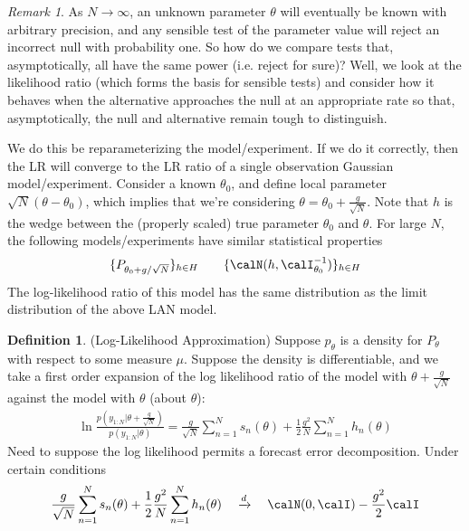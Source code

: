 \documentclass[12pt]{article}
\theoremstyle{plain}
\theoremstyle{definition}
\newtheorem{defn}[thm]{Definition}
\theoremstyle{remark}
\newtheorem*{rmk}{Remark}
\newcommand{\ra}{\rightarrow}
\newcommand{\dto}{\xrightarrow{d}}
\newcommand{\sumnN}{\sum^N_{n=1}}
\begin{document}
\begin{rmk}
As $N\ra\infty$, an unknown parameter $\theta$ will eventually be known
with arbitrary precision, and any sensible test of the parameter value
will reject an incorrect null with probability one.
So how do we compare tests that, asymptotically, all have the same power
(i.e. reject for sure)?
Well, we look at the likelihood ratio (which forms the basis for
sensible tests) and consider how it behaves when the alternative
approaches the null at an appropriate rate so that, asymptotically, the
null and alternative remain tough to distinguish.

We do this be reparameterizing the model/experiment.
If we do it correctly, then the LR will converge to the LR ratio of a
single observation Gaussian model/experiment.
Consider a known $\theta_0$, and define local parameter
$\sqrt{N}(\theta-\theta_0)$, which implies that we're considering
$\theta=\theta_0+\frac{g}{\sqrt{N}}$.
Note that $h$ is the wedge between the (properly scaled) true parameter
$\theta_0$ and $\theta$.
For large $N$, the following models/experiments have similar statistical
properties
\begin{align*}
  \{P_{\theta_0+g/\sqrt{N}}\}_{h\in H}
  \qquad
  \{\calN(h,\calI_{\theta_0}^{-1})\}_{h\in H}
\end{align*}
The log-likelihood ratio of this model has the same distribution as the
limit distribution of the above LAN model.
\end{rmk}


\begin{defn}(Log-Likelihood Approximation)
Suppose $p_\theta$ is a density for $P_\theta$ with respect to some
measure $\mu$. Suppose the density is differentiable,
and we take a first order expansion of the log likelihood ratio of the
model with $\theta+\frac{g}{\sqrt{N}}$ against the model with $\theta$
(about $\theta$):
\begin{align*}
  \ln\frac{p(y_{1:N}|\theta+\frac{g}{\sqrt{N}})}{p(y_{1:N}|\theta)}
  =
  \frac{g}{\sqrt{N}}
  \sumnN s_n(\theta)
  +
  \frac{1}{2}\frac{g^2}{N}
  \sumnN
  h_n(\theta)
\end{align*}
Need to suppose the log likelihood permits a forecast error
decomposition.
Under certain conditions
\begin{align*}
  \frac{g}{\sqrt{N}}
  \sumnN s_n(\theta)
  +
  \frac{1}{2}\frac{g^2}{N}
  \sumnN
  h_n(\theta)
  \quad\dto\quad
  \calN(0,\calI)
  -\frac{g^2}{2}
  \calI
\end{align*}
\end{defn}










\end{document}
